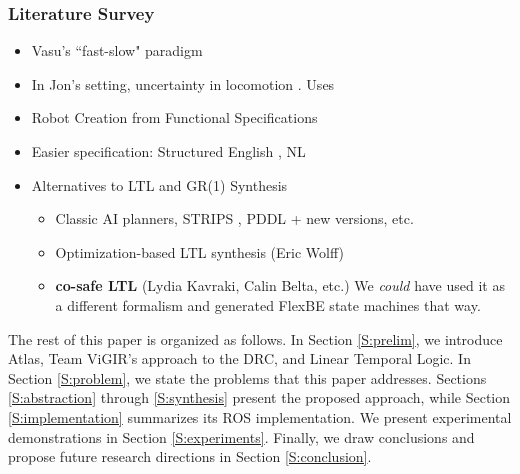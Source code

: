 \subsubsection*{Literature Survey}
\begin{itemize}
	\item Vasu's ``fast-slow" paradigm \cite{Vasu2013ICRA}
	\item In Jon's setting, uncertainty in locomotion \cite{Jon2015ICRA}. Uses \cite{Vasu2013ICRA}
	\item Robot Creation from Functional Specifications \cite{Ankur2015ISRR}
	\item Easier specification: Structured English \cite{JFRKG2012ICRA}, NL \cite{Lignos2015AURO}
	\item Alternatives to LTL and GR(1) Synthesis
	\begin{itemize}
		\item Classic AI planners, STRIPS \cite{STRIPS1971AI}, PDDL \cite{PDDL1998TR} + new versions, etc.
		\item Optimization-based LTL synthesis (Eric Wolff)
		\item \textbf{co-safe LTL} (Lydia Kavraki, Calin Belta, etc.) We \emph{could} have used it as a different formalism and generated FlexBE state machines that way.
	\end{itemize}
\end{itemize}

The rest of this paper is organized as follows.
In Section \ref{S:prelim}, we introduce Atlas, Team ViGIR's approach to the DRC, and Linear Temporal Logic.
In Section \ref{S:problem}, we state the problems that this paper addresses.
Sections \ref{S:abstraction} through \ref{S:synthesis} present the proposed approach, while Section \ref{S:implementation} summarizes its ROS implementation.
We present experimental demonstrations in Section \ref{S:experiments}.
Finally, we draw conclusions and propose future research directions in Section \ref{S:conclusion}.

